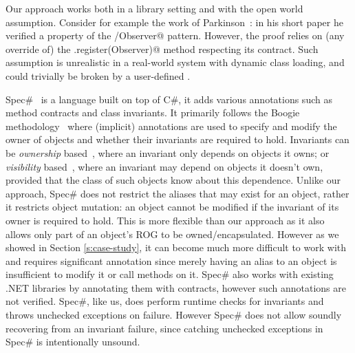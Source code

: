 Our approach works both  in a library setting and with the open world assumption.
Consider for example the work of Parkinson~\cite{parkinson2007class}: in his short paper he verified a property of the \Q@Subject/Observer@ pattern. However, the proof relies on (any override of) the \Q@Subject.register(Observer)@ method respecting its contract. Such assumption is unrealistic in a real-world system with dynamic class loading, and could trivially be broken by a user-defined \Q@EvilSubject@.

Spec\#~\cite{Barnett:2004:SPS:2131546.2131549} is a language built on top of C\#, it adds various annotations such as method contracts and class invariants. 
It primarily follows the Boogie methodology~\cite{DBLP:journals/tcs/NaumannB06} where (implicit) annotations are used to specify and modify the owner of objects and whether their invariants are required to hold. Invariants can be \emph{ownership} based~\cite{DBLP:journals/jot/BarnettDFLS04}, where an invariant only depends on objects it owns; or \emph{visibility} based~\cite{DBLP:conf/mpc/BarnettN04,DBLP:conf/ecoop/LeinoM04}, where an invariant may depend on objects it doesn't own, provided that the class of such objects know about this dependence. Unlike our approach, Spec\# does not restrict the aliases that may exist for an object, rather it restricts object mutation: an object cannot be modified if the invariant of its owner is required to hold. This is more flexible than our approach as it also allows only part of an object's ROG to be owned/encapsulated. However as we showed in Section \ref{s:case-study}, it can become much more difficult to work with and requires significant annotation since merely having an alias to an object
is insufficient to modify it or call methods on it.
Spec\# also works with existing .NET libraries by annotating them with contracts, however such annotations are not verified. Spec\#, like us, does perform runtime checks for invariants and throws unchecked exceptions on failure.  However Spec\# does not allow soundly recovering from an invariant failure, since catching unchecked exceptions in Spec\# is intentionally unsound.~\cite{Leino2004ExceptionSF}



